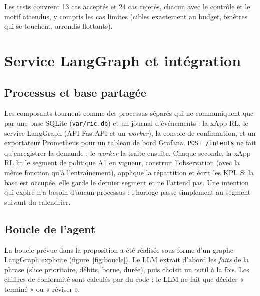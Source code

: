 \documentclass[11pt,a4paper]{article}
\newcommand{\tool}[1]{\texttt{#1}}
\begin{document}
Les tests couvrent 13 cas acceptés et 24 cas rejetés, chacun avec le contrôle et le motif
attendus, y compris les cas limites (cibles exactement au budget, fenêtres qui se touchent,
arrondis flottants).

\section{Service LangGraph et intégration}

\subsection{Processus et base partagée}

Les composants tournent comme des processus séparés qui ne communiquent que par une base
SQLite (\tool{var/ric.db}) et un journal d'événements : la xApp RL, le service LangGraph (API
FastAPI et un \emph{worker}), la console de confirmation, et un exportateur Prometheus pour un
tableau de bord Grafana. \tool{POST /intents} ne fait qu'enregistrer la demande ; le
\emph{worker} la traite ensuite. Chaque seconde, la xApp RL lit le segment de politique A1 en
vigueur, construit l'observation (avec la même fonction qu'à l'entraînement), applique la
répartition et écrit les KPI. Si la base est occupée, elle garde le dernier segment et ne
l'attend pas. Une intention qui expire n'a besoin d'aucun processus : l'horloge passe simplement
au segment suivant du calendrier.

\subsection{Boucle de l'agent}

La boucle prévue dans la proposition a été réalisée sous forme d'un graphe LangGraph explicite
(figure~\ref{fig:boucle}). Le LLM extrait d'abord les \emph{faits} de la phrase (slice prioritaire,
débits, borne, durée), puis choisit un outil à la fois. Les chiffres de conformité sont calculés
par du code ; le LLM ne fait que décider « terminé » ou « réviser ».
\end{document}
